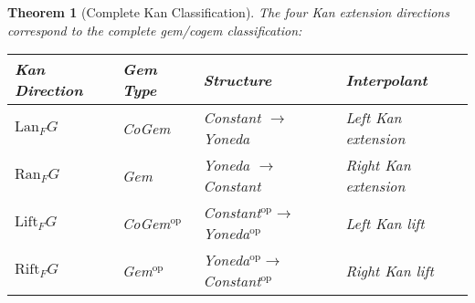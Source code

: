 \documentclass[11pt]{article}
\theoremstyle{plain}
\newtheorem{theorem}{Theorem}[section]
\theoremstyle{definition}
\theoremstyle{remark}
\begin{document}
\begin{theorem}[Complete Kan Classification]
\label{thm:kan-complete}
The four Kan extension directions correspond to the complete gem/cogem classification:

\begin{center}
\begin{tabular}{|l|l|l|l|}
\hline
\textbf{Kan Direction} & \textbf{Gem Type} & \textbf{Structure} & \textbf{Interpolant} \\
\hline
$\mathrm{Lan}_F G$ & CoGem & Constant $\to$ Yoneda & Left Kan extension \\
$\mathrm{Ran}_F G$ & Gem & Yoneda $\to$ Constant & Right Kan extension \\  
$\mathrm{Lift}_F G$ & CoGem$^{\mathrm{op}}$ & Constant$^{\mathrm{op}} \to$ Yoneda$^{\mathrm{op}}$ & Left Kan lift \\
$\mathrm{Rift}_F G$ & Gem$^{\mathrm{op}}$ & Yoneda$^{\mathrm{op}} \to$ Constant$^{\mathrm{op}}$ & Right Kan lift \\
\hline
\end{tabular}
\end{center}
\end{theorem}
\end{document}
